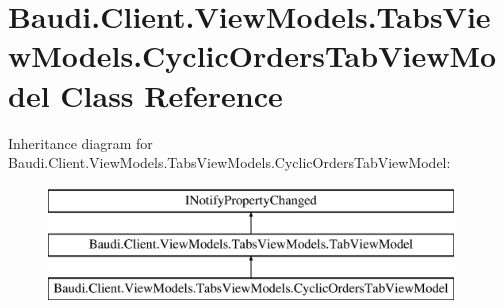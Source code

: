 \hypertarget{class_baudi_1_1_client_1_1_view_models_1_1_tabs_view_models_1_1_cyclic_orders_tab_view_model}{}\section{Baudi.\+Client.\+View\+Models.\+Tabs\+View\+Models.\+Cyclic\+Orders\+Tab\+View\+Model Class Reference}
\label{class_baudi_1_1_client_1_1_view_models_1_1_tabs_view_models_1_1_cyclic_orders_tab_view_model}
Inheritance diagram for Baudi.\+Client.\+View\+Models.\+Tabs\+View\+Models.\+Cyclic\+Orders\+Tab\+View\+Model\+:\begin{figure}[H]
\begin{center}
\leavevmode
\includegraphics[height=3.000000cm]{class_baudi_1_1_client_1_1_view_models_1_1_tabs_view_models_1_1_cyclic_orders_tab_view_model}
\end{center}
\end{figure}
